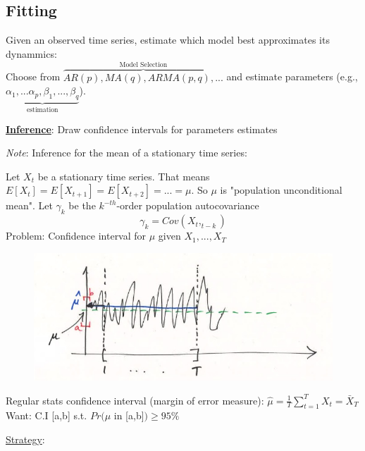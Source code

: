\subsection{Fitting}

Given an observed time series, estimate which model best approximates its dynammics:\\
\quad Choose from $\overbrace{AR(p),MA(q),ARMA(p,q),...}^\text{Model Selection}$ and estimate parameters (e.g., $\underbrace{\alpha_1,...\alpha_p, \beta_1,...,\beta_q}_\text{estimation}$).

\bigskip
\textbf{\underline{Inference}}: \quad Draw confidence intervals for parameters estimates

\textit{Note}: Inference for the mean of a stationary time series:

Let $X_t$ be a stationary time series. That means $E[X_t]=E[X_{t+1}]=E[X_{t+2}]=...=\mu $. So $\mu$ is "population unconditional mean". Let $\gamma_k$ be the $k^{-th}$-order population autocovariance
\[
\gamma_k=Cov(X_t,_{t-k})
\]
Problem: Confidence interval for $\mu$ given $X_1,...,X_T$

\begin{figure}[h]
\includegraphics[scale=0.4]{images/Screenshot 2024-03-31 at 16.34.09.jpg}
\centering
\end{figure}

Regular stats confidence interval (margin of error measure): $\hat{\mu}=\frac{1}{T}\sum_{t=1}^T X_t=\bar{X}_T$\\

Want: C.I [a,b] s.t. $Pr(\mu$ in [a,b]$) \geq 95\%$

\bigskip

\underline{Strategy}:


